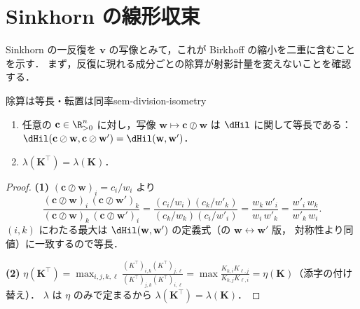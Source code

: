 \section{Sinkhorn の線形収束}
\label{sec:sem-sinkhorn-convergence}

Sinkhorn の一反復を $\mathbf{v}$ の写像とみて，これが Birkhoff の縮小を二重に含むことを示す．
まず，反復に現れる成分ごとの除算が射影計量を変えないことを確認する．

\begin{claim}{除算は等長・転置は同率}{sem-division-isometry}
  \begin{enumerate}
    \item 任意の $\mathbf{c} \in \R_{>0}^n$ に対し，写像 $\mathbf{w} \mapsto \mathbf{c}\oslash\mathbf{w}$ は
      $\dHil$ に関して等長である：$\dHil(\mathbf{c}\oslash\mathbf{w}, \mathbf{c}\oslash\mathbf{w}')
      = \dHil(\mathbf{w}, \mathbf{w}')$．
    \item $\lambda(\mathbf{K}^\top) = \lambda(\mathbf{K})$．
  \end{enumerate}
\end{claim}

\begin{proof}
  \textbf{(1)} $(\mathbf{c}\oslash\mathbf{w})_i = c_i / w_i$ より
  \[
    \frac{(\mathbf{c}\oslash\mathbf{w})_i\,(\mathbf{c}\oslash\mathbf{w}')_k}
         {(\mathbf{c}\oslash\mathbf{w})_k\,(\mathbf{c}\oslash\mathbf{w}')_i}
    = \frac{(c_i/w_i)(c_k/w'_k)}{(c_k/w_k)(c_i/w'_i)}
    = \frac{w_k\, w'_i}{w_i\, w'_k}
    = \frac{w'_i\, w_k}{w'_k\, w_i}.
  \]
  $(i,k)$ にわたる最大は $\dHil(\mathbf{w}, \mathbf{w}')$ の定義式（の $\mathbf{w}\leftrightarrow\mathbf{w}'$ 版，
  対称性より同値）に一致するので等長．

  \textbf{(2)} $\eta(\mathbf{K}^\top) = \max_{i,j,k,\ell}\frac{(K^\top)_{i,k}(K^\top)_{j,\ell}}{(K^\top)_{j,k}(K^\top)_{i,\ell}}
  = \max\frac{K_{k,i}K_{\ell,j}}{K_{k,j}K_{\ell,i}} = \eta(\mathbf{K})$（添字の付け替え）．
  $\lambda$ は $\eta$ のみで定まるから $\lambda(\mathbf{K}^\top) = \lambda(\mathbf{K})$．
\end{proof}


